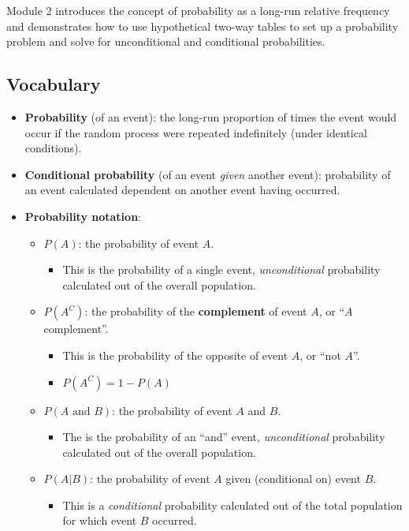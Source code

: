 \documentclass[
]{report}
\providecommand{\tightlist}{%
  \setlength{\itemsep}{0pt}\setlength{\parskip}{0pt}}
\begin{document}
Module 2 introduces the concept of probability as a long-run relative frequency and demonstrates how to use hypothetical two-way tables to set up a probability problem and solve for unconditional and conditional probabilities.

\subsection{Vocabulary}\label{vocabulary-1}

\begin{itemize}
\item
  \textbf{Probability} (of an event): the long-run proportion of times the event would occur if the random process were repeated indefinitely (under identical conditions).
\item
  \textbf{Conditional probability} (of an event \emph{given} another event): probability of an event calculated dependent on another event having occurred.
\item
  \textbf{Probability notation}:

  \begin{itemize}
  \item
    \(P(A)\): the probability of event \(A\).

    \begin{itemize}
    \tightlist
    \item
      This is the probability of a single event, \emph{unconditional} probability calculated out of the overall population.
    \end{itemize}
  \item
    \(P(A^C)\): the probability of the \textbf{complement} of event \(A\), or ``\(A\) complement''.

    \begin{itemize}
    \item
      This is the probability of the opposite of event \(A\), or ``not \(A\)''.
    \item
      \(P(A^C) = 1 - P(A)\)
    \end{itemize}
  \item
    \(P(A\text{ and }B)\): the probability of event \(A\) and \(B\).

    \begin{itemize}
    \tightlist
    \item
      The is the probability of an ``and'' event, \emph{unconditional} probability calculated out of the overall population.
    \end{itemize}
  \item
    \(P(A|B)\): the probability of event \(A\) given (conditional on) event \(B\).

    \begin{itemize}
    \tightlist
    \item
      This is a \emph{conditional} probability calculated out of the total population for which event \(B\) occurred.
    \end{itemize}
  \end{itemize}
\end{itemize}
\end{document}
